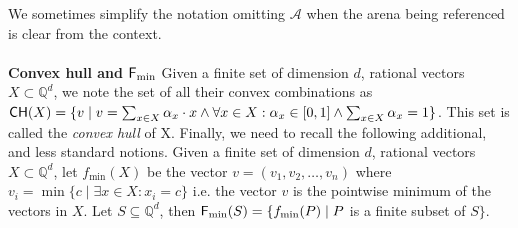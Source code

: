\noindent We sometimes simplify the notation omitting $\mathcal{A}$ when the arena being referenced is clear from the context.
\\
\\
\noindent\textbf{Convex hull and ${\sf F_{\min}}$}
% 
% 
Given a finite set of dimension $d$, rational vectors $X \subset \mathbb{Q}^d$, we note the set of all their convex combinations as ${\sf CH}(X) = \{v \mid v = \sum_{x \in X} \alpha_x\cdot x \land \forall x \in X: \alpha_x \in [0,1] \land \sum_{x \in X}\alpha_x = 1\}$. This set is called the \textit{convex hull} of X. Finally, we need to recall the following additional, and less standard notions. Given a finite set of dimension $d$, rational vectors $X \subset \mathbb{Q}^d$, let $f_{\min}(X)$ be the vector $v = (v_1, v_2, \dots , v_n)$ where $v_i = \min \{c \mid \exists x \in X: x_i = c \}$ i.e. the vector $v$ is the pointwise minimum of the vectors in $X$. Let $S \subseteq \mathbb{Q}^d$, then ${\sf F_{\min}}{(S)} = \{ f_{\min}(P) \mid P $ is a finite subset of $S\}$.

